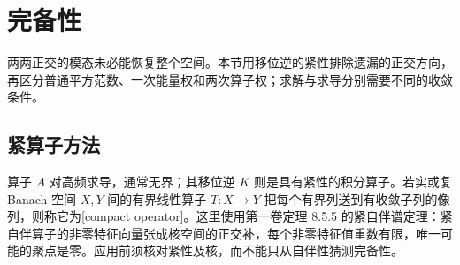 \section{完备性}
\label{b2:sec:1003}

两两正交的模态未必能恢复整个空间。本节用移位逆的紧性排除遗漏的正交方向，再区分普通平方范数、一次能量权和两次算子权；求解与求导分别需要不同的收敛条件。

\subsection{紧算子方法}
\label{b2:subsec:100301}

算子 \(A\) 对高频求导，通常无界；其移位逆 \(K\) 则是具有紧性的积分算子。若实或复 Banach 空间 \(X,Y\) 间的有界线性算子 \(T:X\to Y\) 把每个有界列送到有收敛子列的像列，则称它为[compact operator]。这里使用第一卷定理 8.5.5 的紧自伴谱定理：紧自伴算子的非零特征向量张成核空间的正交补，每个非零特征值重数有限，唯一可能的聚点是零。应用前须核对紧性及核，而不能只从自伴性猜测完备性。

